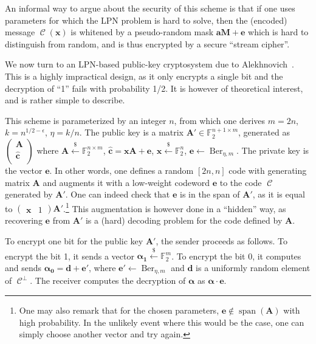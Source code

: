\documentclass[11pt,a4paper]{article}
\theoremstyle{definition}
\DeclareMathOperator\code{\mathcal{C}}
\DeclareMathOperator\Ber{Ber}
\DeclareMathOperator\vspan{span}
\newcommand\ftwo{\mathbb{F}_{2}}
\newcommand\randraw{\xleftarrow{{\scriptscriptstyle\$}}}
\begin{document}
An informal way to argue about the security of this scheme is that if one uses parameters for which the LPN problem is hard to solve, then the (encoded) message $\code(\bm{x})$ is whitened
by a pseudo-random mask $\bm{a}\bm{M} + \bm{e}$ which is hard to distinguish from random, and is thus encrypted by a secure ``stream cipher''.

\medskip

We now turn to an LPN-based public-key cryptosystem due to Alekhnovich~\cite{alekh03}. This is a highly impractical design, as it only encrypts a single bit and the decryption of ``1'' fails with
probability 1/2. It is however of theoretical interest, and is rather simple to describe.

This scheme is parameterized by an integer $n$, from which one derives $m = 2n$, $k = n^{1/2-\epsilon}$, $\eta = k/n$. The public key is a matrix $\bm{A}' \in \ftwo^{n+1\times m}$, generated
as $\begin{pmatrix}\bm{A}\\ \bm{\hat{c}}\\ \end{pmatrix}$ where $\bm{A} \randraw \ftwo^{n\times m}$,  $\bm{\hat{c}} = \bm{x}\bm{A} + \bm{e}$,   $\bm{x} \randraw \ftwo^n$, $\bm{e} \leftarrow \Ber_{\eta,m}$.
The private key is the vector $\bm{e}$.
In other words, one defines a random $[2n,n]$ code with generating matrix $\bm{A}$ and augments it with a low-weight codeword $\bm{e}$ to the code $\code$ generated by $\bm{A}'$. One can indeed check
that $\bm{e}$ is in the span of $\bm{A}'$, as it is equal to $\begin{pmatrix} \bm{x} & 1 \end{pmatrix}\bm{A}'$.\footnote{One may also remark that for the chosen parameters, $\bm{e} \notin \vspan(\bm{A})$
with high probability. In the unlikely event where this would be the case, one can simply choose another vector and try again.}
This augmentation is however done in a ``hidden'' way, as recovering $\bm{e}$
from $\bm{A}'$ is a (hard) decoding problem for the code defined by $\bm{A}$.

To encrypt one bit for the public key $\bm{A}'$, the sender proceeds as follows. To encrypt the bit 1, it sends a vector $\bm{\alpha_1} \randraw \ftwo^m$. To encrypt the bit 0,
it computes and sends $\bm{\alpha_0} = \bm{d} + \bm{e}'$, where $\bm{e}' \leftarrow \Ber_{\eta,m}$ and $\bm{d}$ is a uniformly random element of $\code^\bot$.
The receiver computes the decryption of $\bm{\alpha}$ as $\bm{\alpha} \cdot \bm{e}$.
\end{document}

